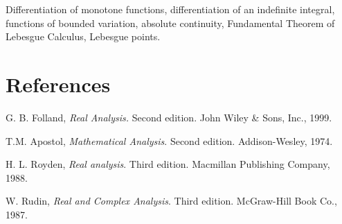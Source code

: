 \documentclass[12pt]{amsart}
\begin{document}
Differentiation of monotone functions, differentiation of an indefinite
integral, functions of bounded variation, absolute continuity,
Fundamental Theorem of Lebesgue Calculus, Lebesgue points.

\section{References}

G. B. Folland, \emph{Real Analysis.} Second edition. John Wiley \& Sons,
Inc., 1999.

T.M. Apostol, \emph{Mathematical Analysis}. Second edition.
Addison-Wesley, 1974.

H. L. Royden, \emph{Real analysis}. Third edition. Macmillan Publishing
Company, 1988.

W. Rudin, \emph{Real and Complex Analysis}. Third edition. McGraw-Hill
Book Co., 1987.
\end{document}

